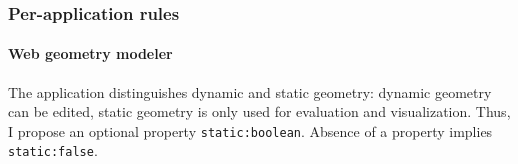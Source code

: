 \subsubsection{Per-application rules}
\label{sec:services:appru}

\paragraph{Web geometry modeler}
The application distinguishes dynamic and static geometry:
dynamic geometry can be edited, static geometry is only used for evaluation and visualization.
Thus, I propose an optional property \texttt{static:\color{blue}boolean}.
Absence of a property implies \texttt{static:\color{brown}false}.

\clearpage

